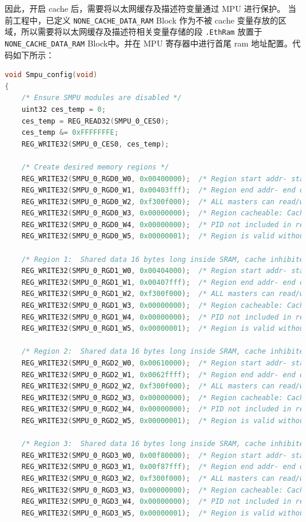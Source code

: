 因此，开启 cache 后，需要将以太网缓存及描述符变量通过 MPU 进行保护。
当前工程中，已定义 \lstinline{NONE_CACHE_DATA_RAM} Block 作为不被 cache 变量存放的区域，所以需要将以太网缓存及描述符相关变量存储的段
\lstinline{.EthRam} 放置于 \lstinline{NONE_CACHE_DATA_RAM} Block中。并在 MPU 寄存器中进行首尾 ram 地址配置。代码如下所示：


\begin{lstlisting}[language=C,style=C]
void Smpu_config(void) 
{
    /* Ensure SMPU modules are disabled */
    uint32 ces_temp = 0;
    ces_temp = REG_READ32(SMPU_0_CES0);
    ces_temp &= 0xFFFFFFFE;
    REG_WRITE32(SMPU_0_CES0, ces_temp);

    /* Create desired memory regions */
    REG_WRITE32(SMPU_0_RGD0_W0, 0x00400000);  /* Region start addr- start of SRAM */
    REG_WRITE32(SMPU_0_RGD0_W1, 0x00403fff);  /* Region end addr- end of SRAM  */
    REG_WRITE32(SMPU_0_RGD0_W2, 0xf300f000);  /* ALL masters can read/write */
    REG_WRITE32(SMPU_0_RGD0_W3, 0x00000000);  /* Region cacheable: Cache Inhibit=0*/
    REG_WRITE32(SMPU_0_RGD0_W4, 0x00000000);  /* PID not included in region eval. */
    REG_WRITE32(SMPU_0_RGD0_W5, 0x00000001);  /* Region is valid without lock */

    /* Region 1:  Shared data 16 bytes long inside SRAM, cache inhibited */
    REG_WRITE32(SMPU_0_RGD1_W0, 0x00404000);  /* Region start addr- start of SRAM */
    REG_WRITE32(SMPU_0_RGD1_W1, 0x00407fff);  /* Region end addr- end of SRAM  */
    REG_WRITE32(SMPU_0_RGD1_W2, 0xf300f000);  /* ALL masters can read/write */
    REG_WRITE32(SMPU_0_RGD1_W3, 0x00000000);  /* Region cacheable: Cache Inhibit=0*/
    REG_WRITE32(SMPU_0_RGD1_W4, 0x00000000);  /* PID not included in region eval. */
    REG_WRITE32(SMPU_0_RGD1_W5, 0x00000001);  /* Region is valid without lock */

    /* Region 2:  Shared data 16 bytes long inside SRAM, cache inhibited */
    REG_WRITE32(SMPU_0_RGD2_W0, 0x00610000);  /* Region start addr- start of SRAM */
    REG_WRITE32(SMPU_0_RGD2_W1, 0x0062ffff);  /* Region end addr- end of SRAM  */
    REG_WRITE32(SMPU_0_RGD2_W2, 0xf300f000);  /* ALL masters can read/write */
    REG_WRITE32(SMPU_0_RGD2_W3, 0x00000000);  /* Region cacheable: Cache Inhibit=0*/
    REG_WRITE32(SMPU_0_RGD2_W4, 0x00000000);  /* PID not included in region eval. */
    REG_WRITE32(SMPU_0_RGD2_W5, 0x00000001);  /* Region is valid without lock */

    /* Region 3:  Shared data 16 bytes long inside SRAM, cache inhibited */
    REG_WRITE32(SMPU_0_RGD3_W0, 0x00f80000);  /* Region start addr- start of SRAM */
    REG_WRITE32(SMPU_0_RGD3_W1, 0x00f87fff);  /* Region end addr- end of SRAM  */
    REG_WRITE32(SMPU_0_RGD3_W2, 0xf300f000);  /* ALL masters can read/write */
    REG_WRITE32(SMPU_0_RGD3_W3, 0x00000000);  /* Region cacheable: Cache Inhibit=0*/
    REG_WRITE32(SMPU_0_RGD3_W4, 0x00000000);  /* PID not included in region eval. */
    REG_WRITE32(SMPU_0_RGD3_W5, 0x00000001);  /* Region is valid without lock */


\end{lstlisting}
